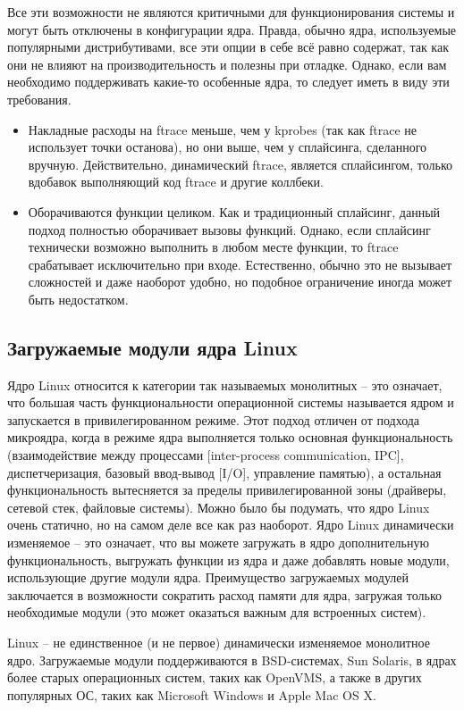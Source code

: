 \documentclass[a4paper,14pt]{extarticle}
\begin{document}
 	Все эти возможности не являются критичными для функционирования системы и могут быть отключены в конфигурации ядра. Правда, обычно ядра, используемые популярными дистрибутивами, все эти опции в себе всё равно содержат, так как они не влияют на производительность и полезны при отладке. Однако, если вам необходимо поддерживать какие-то особенные ядра, то следует иметь в виду эти требования.
 	
 	\begin{itemize}
 		\item Накладные расходы на ftrace меньше, чем у kprobes (так как ftrace не использует точки останова), но они выше, чем у сплайсинга, сделанного вручную. Действительно, динамический ftrace, является сплайсингом, только вдобавок выполняющий код ftrace и другие коллбеки.
 		\item Оборачиваются функции целиком. Как и традиционный сплайсинг, данный подход полностью оборачивает вызовы функций. Однако, если сплайсинг технически возможно выполнить в любом месте функции, то ftrace срабатывает исключительно при входе. Естественно, обычно это не вызывает сложностей и даже наоборот удобно, но подобное ограничение иногда может быть недостатком.
 	\end{itemize}
 
 	\subsection{Загружаемые модули ядра Linux }
 	Ядро Linux относится к категории так называемых монолитных – это означает, что большая часть функциональности операционной системы называется ядром и запускается в привилегированном режиме. Этот подход отличен от подхода микроядра, когда в режиме ядра выполняется только основная функциональность (взаимодействие между процессами [inter-process communication, IPC], диспетчеризация, базовый ввод-вывод [I/O], управление памятью), а остальная функциональность вытесняется за пределы привилегированной зоны (драйверы, сетевой стек, файловые системы). Можно было бы подумать, что ядро Linux очень статично, но на самом деле все как раз наоборот.
 	Ядро Linux динамически изменяемое – это означает, что вы можете загружать в ядро дополнительную функциональность, выгружать функции из ядра и даже добавлять новые модули, использующие другие модули ядра. Преимущество загружаемых модулей заключается в возможности сократить расход памяти для ядра, загружая только необходимые модули (это может оказаться важным для встроенных систем).
 	
 	Linux – не единственное (и не первое) динамически изменяемое монолитное ядро. Загружаемые модули поддерживаются в BSD-системах, Sun Solaris, в ядрах более старых операционных систем, таких как OpenVMS, а также в других популярных ОС, таких как Microsoft Windows и Apple Mac OS X.
 	
\end{document}
